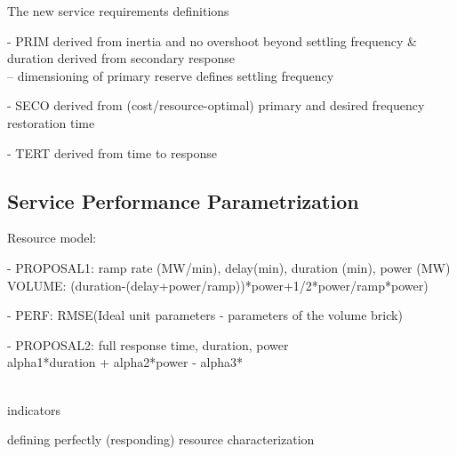 The new service requirements definitions

- PRIM derived from inertia and no overshoot beyond settling frequency \& duration derived from secondary response \\
-- dimensioning of primary reserve defines settling frequency

- SECO derived from (cost/resource-optimal) primary and desired frequency restoration time 

- TERT derived from time to response


\subsection{Service Performance Parametrization}
Resource model: 

 - PROPOSAL1: ramp rate (MW/min), delay(min), duration (min), power (MW)\\
 
VOLUME:  (duration-(delay+power/ramp))*power+1/2*power/ramp*power)
 
- PERF: RMSE(Ideal unit parameters - parameters of the volume brick)
 
 - PROPOSAL2: full response time, duration, power\\
 
 alpha1*duration + alpha2*power - alpha3*

\\
indicators

defining perfectly (responding) resource characterization


